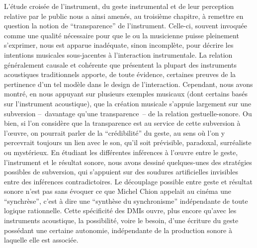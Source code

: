 
\noindent L’étude croisée de l’instrument, du geste instrumental et de leur perception relative par le public nous a ainsi amenés, au troisième chapitre, à remettre en question la notion de ``transparence'' de l’instrument. Celle-ci, souvent invoquée comme une qualité nécessaire pour que le ou la musicienne puisse pleinement s’exprimer, nous est apparue inadéquate, sinon incomplète, pour décrire les intentions musicales sous-jacentes à l’interaction instrumentale. La relation généralement causale et cohérente que présentent la plupart des instruments acoustiques traditionnels apporte, de toute évidence, certaines preuves de la pertinence d'un tel modèle dans le design de l'interaction. Cependant, nous avons montré, en nous appuyant sur plusieurs exemples musicaux (dont certains basés sur l’instrument acoustique), que la création musicale s’appuie largement sur une subversion --~davantage qu’une transparence~-- de la relation gestuelle-sonore. Ou bien, si l'on considère que la transparence est au service de cette subversion à l'œuvre, on pourrait parler de la ``crédibilité'' du geste, au sens où l'on y percevrait toujours un lien avec le son, qu'il soit prévisible, paradoxal, surréaliste ou mystérieux.
En étudiant les différentes inférences à l’œuvre entre le geste, l’instrument et le résultat sonore, nous avons dessiné quelques-unes des stratégies possibles de subversion, qui s’appuient sur des soudures artificielles invisibles entre des inférences contradictoires. Le découplage possible entre geste et résultat sonore n'est pas sans évoquer ce que Michel Chion appelait au cinéma une ``synchrèse'', c'est à dire une ``synthèse du synchronisme'' indépendante de toute logique rationnelle\cite{chion_audio-vision:_2013}. Cette spécificité des \glspl{DMI} ouvre, plus encore qu'avec les instruments acoustique, la possibilité, voire le besoin, d'une écriture du geste possédant une certaine autonomie, indépendante de la production sonore à laquelle elle est associée. 



